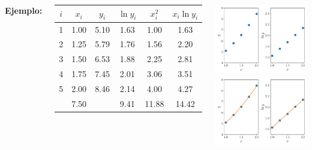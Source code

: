 \documentclass[9pt, aspectratio=169]{beamer}
\begin{document}
\begin{frame}
\begin{columns}
\cx
\textbf{Ejemplo:}

\begin{center}
\begin{tabular}{cccccc}
\toprule
$i$ & $x_i$ & $y_i$ & $\ln y_i$ & $x_i^2$ & $x_i \ln y_i$ \\
\midrule
 1 & 1.00 & 5.10 & 1.63 & 1.00 & 1.63 \\ 
 2 & 1.25 & 5.79 & 1.76 & 1.56 & 2.20 \\
 3 & 1.50 & 6.53 & 1.88 & 2.25 & 2.81 \\
 4 & 1.75 & 7.45 & 2.01 & 3.06 & 3.51 \\ 
 5 & 2.00 & 8.46 & 2.14 & 4.00 & 4.27 \\
\midrule
   & 7.50 & & 9.41 & 11.88 & 14.42 \\
\bottomrule
\end{tabular}
\end{center}

\cx
\begin{center}
    \begin{overprint}
     \includegraphics[scale=0.4]{figs/fig-05.pdf}
     \includegraphics[scale=0.4]{figs/fig-05b.pdf} 
\end{overprint}
\end{center}
\end{columns} \pause


\end{frame}
\end{document}
